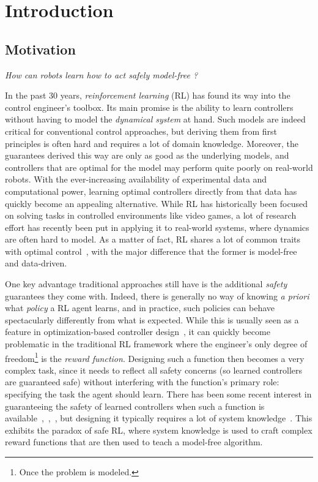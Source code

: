 \chapter{Introduction} \label{chap:intro}

\section{Motivation}
	\emph{How can robots learn how to act safely model-free ?} \par
	In the past 30 years, \emph{reinforcement learning} (RL) has found its way into the control engineer's toolbox. Its main promise is the ability to learn controllers without having to model the\emph{ dynamical system} at hand. Such models are indeed critical for conventional control approaches, but deriving them from first principles is often hard and requires a lot of domain knowledge. Moreover, the guarantees derived this way are only as good as the underlying models, and controllers that are optimal for the model may perform quite poorly on real-world robots. With the ever-increasing availability of experimental data and computational power, learning optimal controllers directly from that data has quickly become an appealing alternative. While RL has historically been focused on solving tasks in controlled environments like video games, a lot of research effort has recently been put in applying it to real-world systems, where dynamics are often hard to model. As a matter of fact, RL shares a lot of common traits with optimal control~\cite{sutton1992reinforcement}, with the major difference that the former is model-free and data-driven. \par
	One key advantage traditional approaches still have is the additional\emph{ safety} guarantees they come with. Indeed, there is generally no way of knowing\emph{ a priori} what\emph{ policy} a RL agent learns, and in practice, such policies can behave spectacularly differently from what is expected. While this is usually seen as a feature in optimization-based controller design~\cite{baker2019emergent}, it can quickly become problematic in the traditional RL framework where the engineer's only degree of freedom\footnote{Once the problem is modeled.} is the\emph{ reward function}. Designing such a function then becomes a very complex task, since it needs to reflect all safety concerns (so learned controllers are guaranteed safe) without interfering with the function's primary role: specifying the task the agent should learn. There has been some recent interest in guaranteeing the safety of learned controllers when such a function is available~\cite{hans2008safe},~\cite{turchetta2016safe},~\cite{berkenkamp2016safe}, but designing it typically requires a lot of system knowledge~\needcite. This exhibits the paradox of safe RL, where system knowledge is used to craft complex reward functions that are then used to teach a model-free algorithm.\par
